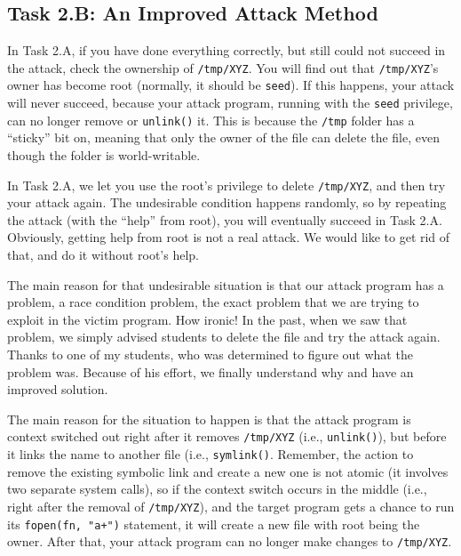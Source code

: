 \subsection{Task 2.B: An Improved Attack Method}

In Task 2.A, if you have done everything correctly, but still could not succeed
in the attack, check the ownership of \texttt{/tmp/XYZ}. You will find out    
that \texttt{/tmp/XYZ}'s owner has become root (normally, it should be \texttt{seed}). 
If this happens, your attack will never succeed, because your attack
program, running with the \texttt{seed} privilege, can no longer remove or
\texttt{unlink()} it.  
This is because the \texttt{/tmp}
folder has a ``sticky'' bit on, meaning that only the owner of the file can
delete the file, even though the folder is world-writable. 


In Task 2.A, we let you use the root's privilege to delete \texttt{/tmp/XYZ}, 
and then try your attack again. The undesirable condition happens randomly,
so by repeating the attack (with the ``help'' from root), you will eventually
succeed in Task 2.A. Obviously, getting help from root is not a real attack. 
We would like to get rid of that, and do it without root's help.


The main reason for that undesirable situation is that 
our attack program has a problem, a race condition problem, the exact problem that
we are trying to exploit in the victim program. How ironic!  
In the past, when we saw that problem, we simply advised students to 
delete the file and try the attack again. Thanks to one of my students, 
who was determined to figure out what the problem was. Because of his effort,
we finally understand why and have an improved solution. 


The main reason for the situation to happen is that the attack program is 
context switched out right after it removes {\tt /tmp/XYZ} (i.e., \texttt{unlink()}),
but before it links the name to another file (i.e., \texttt{symlink()}. 
Remember, the action to remove the existing 
symbolic link and create a new one is not atomic (it involves two 
separate system calls), so if the context switch occurs in the middle
(i.e., right after the removal of {\tt /tmp/XYZ}),
and the target \setuid program gets a chance to run its 
{\tt fopen(fn, "a+")} statement, it will create a new file with root being the owner.
After that, your attack program can no longer make changes to {\tt /tmp/XYZ}.


